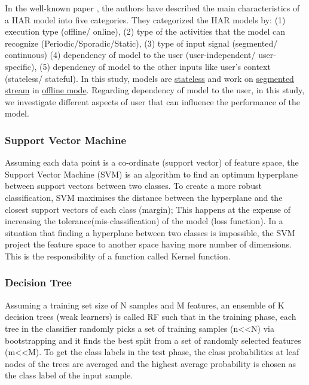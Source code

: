 \documentclass[journal,article,submit,moreauthors,pdftex]{Definitions/mdpi}
\begin{document}
In the well-known paper \cite{bulling2014tutorial}, the authors have described the main characteristics of a HAR model into five categories. They categorized the HAR models by: (1) execution type (offline/ online), (2) type of the activities that the model can recognize (Periodic/Sporadic/Static), (3) type of input signal (segmented/ continuous) (4) dependency of model to the user (user-independent/ user-specific), (5) dependency of model to the other inputs like user's context (stateless/ stateful).  In this study, models are \underline{stateless} and work on \underline{segmented stream} in \underline{offline mode}. Regarding dependency of model to the user, in this study, we investigate different aspects of user that can influence the performance of the model.\\

\subsubsection{Support Vector Machine}
Assuming each data point is a co-ordinate (support vector) of feature space, the Support Vector Machine (SVM) is an algorithm to find an optimum hyperplane between support vectors between two classes. To create a more robust classification, SVM maximises the distance between the hyperplane and the closest support vectors of each class (margin); This happens at the expense of increasing the tolerance(mis-classification) of the model (loss function). In a situation that finding a hyperplane between two classes is impossible, the SVM project the feature space to another space having more number of dimensions. This is the responsibility of a function called Kernel function.
\subsubsection{Decision Tree}
Assuming a training set size of N samples and M features, an ensemble of K decision trees (weak learners) is called RF such that in the training phase, each tree in the classifier randomly picks a set of training samples (n<<N) via bootstrapping and it finds the best split from a set of randomly selected features (m<<M). To get the class labels in the test phase, the class probabilities at leaf nodes of the trees are averaged and the highest average probability is chosen as the class label of the input sample.
\end{document}
